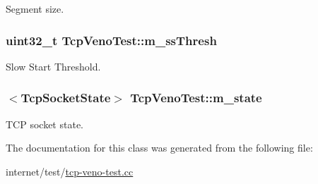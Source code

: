 Segment size. 

\subsubsection[{\texorpdfstring{m\+\_\+ss\+Thresh}{m_ssThresh}}]{\setlength{\rightskip}{0pt plus 5cm}uint32\+\_\+t Tcp\+Veno\+Test\+::m\+\_\+ss\+Thresh\hspace{0.3cm}{\ttfamily [private]}}\hypertarget{classTcpVenoTest_ab687dc972314acea4861c499a99ed5f1}{}\label{classTcpVenoTest_ab687dc972314acea4861c499a99ed5f1}


Slow Start Threshold. 

\subsubsection[{\texorpdfstring{m\+\_\+state}{m_state}}]{$<${\bf Tcp\+Socket\+State}$>$ Tcp\+Veno\+Test\+::m\+\_\+state\hspace{0.3cm}{\ttfamily [private]}}\hypertarget{classTcpVenoTest_abb83a5490fca559c6233283e33a05c26}{}\label{classTcpVenoTest_abb83a5490fca559c6233283e33a05c26}


T\+CP socket state. 



The documentation for this class was generated from the following file\+:\begin{DoxyCompactItemize}
\item 
internet/test/\hyperlink{tcp-veno-test_8cc}{tcp-\/veno-\/test.\+cc}\end{DoxyCompactItemize}
